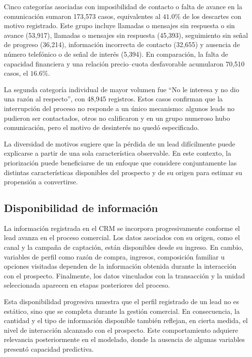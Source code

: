Cinco categorías asociadas con imposibilidad de contacto o falta de avance en la comunicación sumaron 173{,}573 casos, equivalentes al $41.0\%$ de los descartes con motivo registrado. Este grupo incluye llamadas o mensajes sin respuesta o sin avance (53{,}917), llamadas o mensajes sin respuesta (45{,}393), seguimiento sin señal de progreso (36{,}214), información incorrecta de contacto (32{,}655) y ausencia de número telefónico o de señal de interés (5{,}394). En comparación, la falta de capacidad financiera y una relación precio--cuota desfavorable acumularon 70{,}510 casos, el $16.6\%$.

La segunda categoría individual de mayor volumen fue ``No le interesa y no dio una razón al respecto'', con 48{,}945 registros. Estos casos confirman que la interrupción del proceso no responde a un único mecanismo: algunos leads no pudieron ser contactados, otros no calificaron y en un grupo numeroso hubo comunicación, pero el motivo de desinterés no quedó especificado. 

La diversidad de motivos sugiere que la pérdida de un lead difícilmente puede explicarse a partir de una sola característica observable. En este contexto, la priorización puede beneficiarse de un enfoque que considere conjuntamente las distintas características disponibles del prospecto y de su origen para estimar su propensión a convertirse.


\subsection{Disponibilidad de información}

La información registrada en el CRM se incorpora progresivamente conforme el lead avanza en el proceso comercial. Los datos asociados con su origen, como el canal y la campaña de captación, están disponibles desde su ingreso. En cambio, variables de perfil como razón de compra, ingresos, composición familiar u opciones visitadas dependen de la información obtenida durante la interacción con el prospecto. Finalmente, los datos vinculados con la transacción y la unidad seleccionada aparecen en etapas posteriores del proceso.

Esta disponibilidad progresiva muestra que el perfil registrado de un lead no es estático, sino que se completa durante la gestión comercial. En consecuencia, la cantidad y el tipo de información disponible también reflejan, en cierta medida, el nivel de interacción alcanzado con el prospecto. Este comportamiento adquiere relevancia posteriormente en el modelado, donde la ausencia de algunas variables presentó capacidad predictiva.

